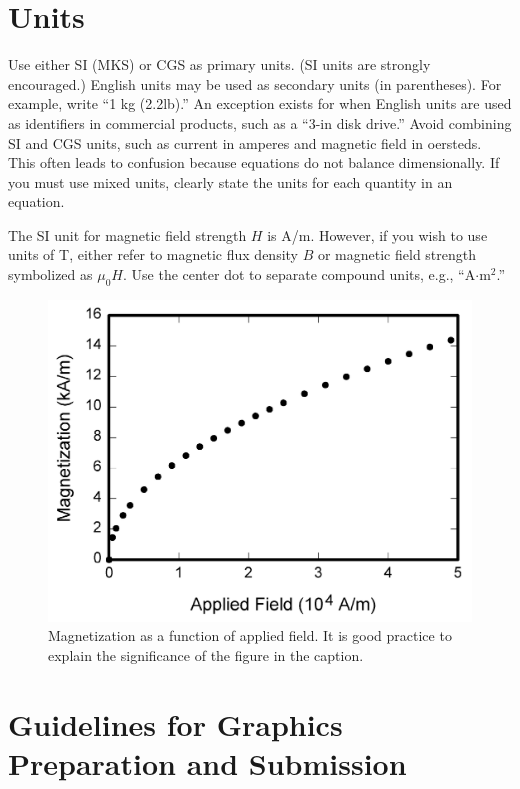 \documentclass[journal,twoside,web]{ieeecolor}
\begin{document}
\section{Units}
Use either SI (MKS) or CGS as primary units. (SI units are strongly
encouraged.) English units may be used as secondary units (in parentheses).
For example, write ``1 kg (2.2lb).'' An exception exists for when
English units are used as identifiers in commercial products, such as a ``3\textonehalf-in
disk drive.'' Avoid combining SI and CGS units, such as current in amperes
and magnetic field in oersteds. This often leads to confusion because
equations do not balance dimensionally. If you must use mixed units, clearly
state the units for each quantity in an equation.

The SI unit for magnetic field strength $H$ is A/m. However, if you wish to use
units of T, either refer to magnetic flux density $B$ or magnetic field
strength symbolized as $\mu _{0}H$. Use the center dot to separate
compound units, e.g., ``A$\cdot $m$^{2}$.''

\begin{figure}[!t]
    \centerline{\includegraphics[width=\columnwidth]{fig1.png}}
    \caption{Magnetization as a function of applied field.
        It is good practice to explain the significance of the figure in the caption.}
    \label{fig1}
\end{figure}

\section{Guidelines for Graphics Preparation and Submission}
\label{sec:guidelines}
\end{document}
